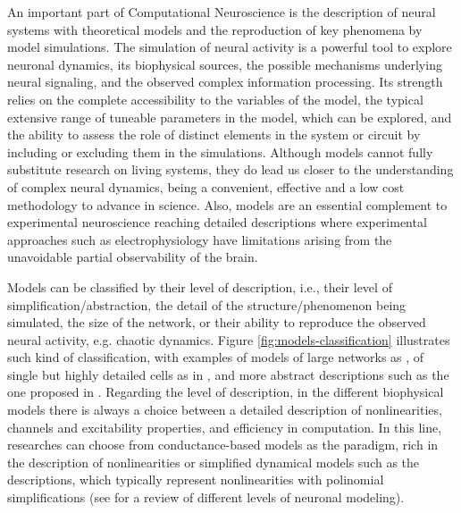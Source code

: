 An important part of Computational Neuroscience is the description of neural systems with theoretical models and the reproduction of key phenomena by model simulations. The simulation of neural activity is a powerful tool to explore neuronal dynamics, its biophysical sources, the possible mechanisms underlying neural signaling, and the observed complex information processing. Its strength relies on the complete accessibility to the variables of the model, the typical extensive range of tuneable parameters in the model, which can be explored,  and the ability to assess the role  of distinct elements in the system or circuit by including or excluding them in the simulations. Although models cannot fully substitute research on living systems, they do lead us closer to the understanding of complex neural dynamics, being a convenient, effective and a low cost methodology to advance in science. Also, models are an essential complement to experimental neuroscience reaching detailed descriptions where experimental approaches such as electrophysiology have limitations arising from the unavoidable partial observability of the brain. 

Models can be classified by their level of description, i.e., their level of simplification/abstraction, the detail of the structure/phenomenon being simulated, the size of the network, or their ability to reproduce the observed neural activity, e.g. chaotic dynamics. Figure \ref{fig:models-classification} illustrates such kind of classification, with examples of models of large networks as \textcite{potjans_celltype_2014,bezaire_interneuronal_2016}, of single but highly detailed cells as in \textcite{smith_dendritic_2013}, and more abstract descriptions such as the one proposed in \textcite{izhikevich_simple_2003}. Regarding the level of description, in the different biophysical models there is always a choice between a detailed description of nonlinearities, channels and excitability properties, and efficiency in computation. In this line, researches can choose from conductance-based models as  the \textcite{hodgkin_quantitative_1952} paradigm, rich in the description of nonlinearities or simplified dynamical models such as the \textcite{hindmarsh_model_1984,fitzhugh_impulses_1961} descriptions, which typically represent nonlinearities with polinomial simplifications (see \cite{torres_modeling_2012} for a review of different levels of neuronal modeling). 



